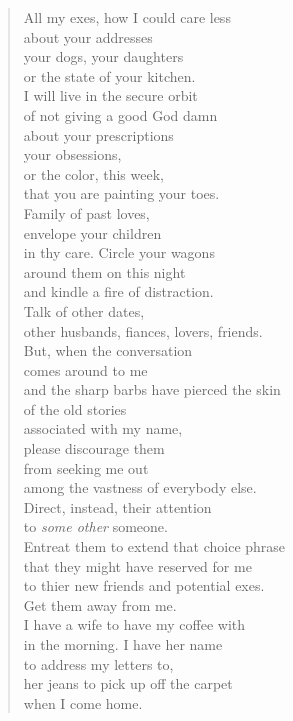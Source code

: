 \begin{verse}
All my exes, how I could care less \\
about your addresses \\
your dogs, your daughters \\
or the state of your kitchen. \\

I will live in the secure orbit \\
of not giving a good God damn \\
about your prescriptions \\
your obsessions, \\
or the color, this week, \\
that you are painting your toes. \\

Family of past loves, \\
envelope your children \\
in thy care. Circle your wagons \\
around them on this night \\
and kindle a fire of distraction. \\
Talk of other dates, \\
other husbands, fiances, lovers, friends. \\

But, when the conversation \\
comes around to me \\
and the sharp barbs have pierced the skin \\
of the old stories \\
associated with my name, \\
please discourage them \\
from seeking me out \\
among the vastness of everybody else. \\

Direct, instead, their attention \\
to \emph{some other} someone. \\
Entreat them to extend that choice phrase \\
that they might have reserved for me \\
to thier new friends and potential exes. \\

Get them away from me. \\
I have a wife to have my coffee with \\
in the morning. I have her name \\
to address my letters to, \\
her jeans to pick up off the carpet \\
when I come home. \\
\end{verse}
